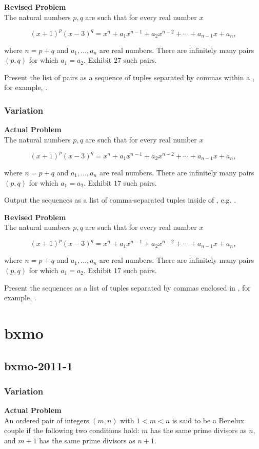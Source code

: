 \textbf{Revised Problem}\\
The natural numbers $p, q$ are such that for every real number $x$

$$
(x+1)^{p}(x-3)^{q}=x^{n}+a_{1} x^{n-1}+a_{2} x^{n-2}+\cdots+a_{n-1} x+a_{n},
$$

where $n=p+q$ and $a_{1}, \ldots, a_{n}$ are real numbers. There are infinitely many pairs $(p, q)$ for which $a_{1}=a_{2}$. Exhibit $27$ such pairs.

Present the list of pairs as a sequence of tuples separated by commas within a \boxed, for example, \boxed{[(2, 19), (3, 123)]}.

\subsubsection{Variation}
\textbf{Actual Problem}\\
The natural numbers $p, q$ are such that for every real number $x$

$$
(x+1)^{p}(x-3)^{q}=x^{n}+a_{1} x^{n-1}+a_{2} x^{n-2}+\cdots+a_{n-1} x+a_{n},
$$

where $n=p+q$ and $a_{1}, \ldots, a_{n}$ are real numbers. There are infinitely many pairs $(p, q)$ for which $a_{1}=a_{2}$. Exhibit $17$ such pairs.

Output the sequences as a list of comma-separated tuples inside of \boxed, e.g. \boxed{[(2, 19), (3, 123)]}.

\textbf{Revised Problem}\\
The natural numbers $p, q$ are such that for every real number $x$

$$
(x+1)^{p}(x-3)^{q}=x^{n}+a_{1} x^{n-1}+a_{2} x^{n-2}+\cdots+a_{n-1} x+a_{n},
$$

where $n=p+q$ and $a_{1}, \ldots, a_{n}$ are real numbers. There are infinitely many pairs $(p, q)$ for which $a_{1}=a_{2}$. Exhibit $17$ such pairs.

Present the sequences as a list of tuples separated by commas enclosed in \boxed, for example, \boxed{[(2, 19), (3, 123)]}.

\section{bxmo}
\subsection{bxmo-2011-1}
\subsubsection{Variation}
\textbf{Actual Problem}\\
An ordered pair of integers $(m, n)$ with $1 < m < n$ is said to be a Benelux couple if the following two conditions hold: $m$ has the same prime divisors as $n$, and $m + 1$ has the same prime divisors as $n + 1$.

